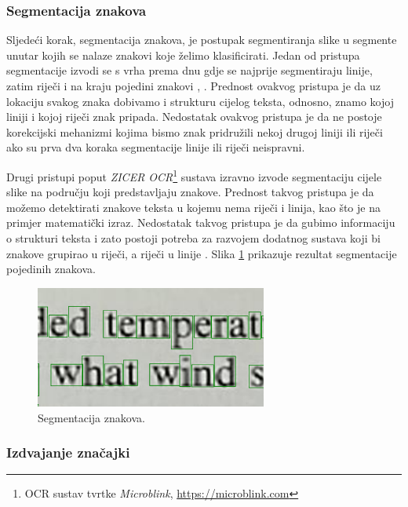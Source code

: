 \documentclass[times, utf8, zavrsni]{fer}
\begin{document}
\subsubsection{Segmentacija znakova}
\label{subsubsec:segmentacija}

Sljedeći korak, segmentacija znakova, je postupak segmentiranja slike u segmente unutar kojih se nalaze znakovi
koje želimo klasificirati. Jedan od pristupa segmentacije izvodi se s vrha prema dnu gdje se najprije
segmentiraju linije, zatim riječi i na kraju pojedini znakovi \citep{Jurin:2017:Master}, \citep{Vynckier:2018:HowOcrWorks}.
Prednost ovakvog pristupa je da uz lokaciju svakog znaka dobivamo i strukturu cijelog teksta, odnosno, znamo kojoj
liniji i kojoj riječi znak pripada. Nedostatak ovakvog pristupa je da ne postoje korekcijski mehanizmi kojima bismo
znak pridružili nekoj drugoj liniji ili riječi ako su prva dva koraka segmentacije linije ili riječi neispravni. \citep{Jurin:2017:Master}

Drugi pristupi poput \emph{ZICER OCR}\footnote{OCR sustav tvrtke \emph{Microblink}, \url{https://microblink.com}} sustava izravno
izvode segmentaciju cijele slike na području koji predstavljaju znakove. Prednost takvog pristupa je da
možemo detektirati znakove teksta u kojemu nema riječi i linija, kao što je na primjer matematički izraz.
Nedostatak takvog pristupa je da gubimo informaciju o strukturi teksta i zato postoji potreba za razvojem dodatnog sustava koji bi znakove
grupirao u riječi, a riječi u linije \citep{Jurin:2017:Master}.
Slika \ref{fig:segmentation} prikazuje rezultat segmentacije pojedinih znakova.

\begin{figure}[htb]
    \centering
    \includegraphics[height=4cm]{images/segmentation.png}
    \caption{Segmentacija znakova.}
    \label{fig:segmentation}
\end{figure}

\pagebreak

\subsubsection{Izdvajanje značajki}
\end{document}
